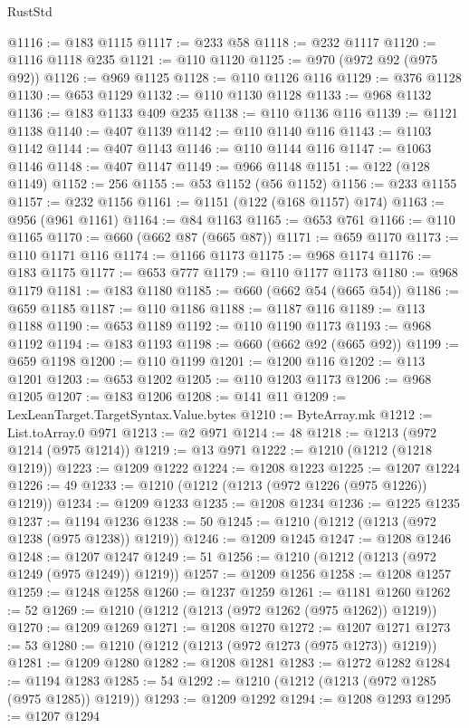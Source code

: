 \begin{lexlean}{RustStd}
\begin{coremodule}
{\begin{coremodule}
{{{{{{{{{{{{{{{{{{{{{{{{{{{{{{{{{{{{{{{{{{{{{{{@1116 := @183 @1115
@1117 := @233 @58
@1118 := @232 @1117
@1120 := @1116 @1118 @235
@1121 := @110 @1120
@1125 := @970 (@972 @92 (@975 @92))
@1126 := @969 @1125
@1128 := @110 @1126 @116
@1129 := @376 @1128
@1130 := @653 @1129
@1132 := @110 @1130 @1128
@1133 := @968 @1132
@1136 := @183 @1133 @409 @235
@1138 := @110 @1136 @116
@1139 := @1121 @1138
@1140 := @407 @1139
@1142 := @110 @1140 @116
@1143 := @1103 @1142
@1144 := @407 @1143
@1146 := @110 @1144 @116
@1147 := @1063 @1146
@1148 := @407 @1147
@1149 := @966 @1148
@1151 := @122 (@128 @1149)
@1152 := 256
@1155 := @53 @1152 (@56 @1152)
@1156 := @233 @1155
@1157 := @232 @1156
@1161 := @1151 (@122 (@168 @1157) @174)
@1163 := @956 (@961 @1161)
@1164 := @84 @1163
@1165 := @653 @761
@1166 := @110 @1165
@1170 := @660 (@662 @87 (@665 @87))
@1171 := @659 @1170
@1173 := @110 @1171 @116
@1174 := @1166 @1173
@1175 := @968 @1174
@1176 := @183 @1175
@1177 := @653 @777
@1179 := @110 @1177 @1173
@1180 := @968 @1179
@1181 := @183 @1180
@1185 := @660 (@662 @54 (@665 @54))
@1186 := @659 @1185
@1187 := @110 @1186
@1188 := @1187 @116
@1189 := @113 @1188
@1190 := @653 @1189
@1192 := @110 @1190 @1173
@1193 := @968 @1192
@1194 := @183 @1193
@1198 := @660 (@662 @92 (@665 @92))
@1199 := @659 @1198
@1200 := @110 @1199
@1201 := @1200 @116
@1202 := @113 @1201
@1203 := @653 @1202
@1205 := @110 @1203 @1173
@1206 := @968 @1205
@1207 := @183 @1206
@1208 := @141 @11
@1209 := LexLeanTarget.TargetSyntax.Value.bytes
@1210 := ByteArray.mk
@1212 := List.toArray.{0} @971
@1213 := @2 @971
@1214 := 48
@1218 := @1213 (@972 @1214 (@975 @1214))
@1219 := @13 @971
@1222 := @1210 (@1212 (@1218 @1219))
@1223 := @1209 @1222
@1224 := @1208 @1223
@1225 := @1207 @1224
@1226 := 49
@1233 := @1210 (@1212 (@1213 (@972 @1226 (@975 @1226)) @1219))
@1234 := @1209 @1233
@1235 := @1208 @1234
@1236 := @1225 @1235
@1237 := @1194 @1236
@1238 := 50
@1245 := @1210 (@1212 (@1213 (@972 @1238 (@975 @1238)) @1219))
@1246 := @1209 @1245
@1247 := @1208 @1246
@1248 := @1207 @1247
@1249 := 51
@1256 := @1210 (@1212 (@1213 (@972 @1249 (@975 @1249)) @1219))
@1257 := @1209 @1256
@1258 := @1208 @1257
@1259 := @1248 @1258
@1260 := @1237 @1259
@1261 := @1181 @1260
@1262 := 52
@1269 := @1210 (@1212 (@1213 (@972 @1262 (@975 @1262)) @1219))
@1270 := @1209 @1269
@1271 := @1208 @1270
@1272 := @1207 @1271
@1273 := 53
@1280 := @1210 (@1212 (@1213 (@972 @1273 (@975 @1273)) @1219))
@1281 := @1209 @1280
@1282 := @1208 @1281
@1283 := @1272 @1282
@1284 := @1194 @1283
@1285 := 54
@1292 := @1210 (@1212 (@1213 (@972 @1285 (@975 @1285)) @1219))
@1293 := @1209 @1292
@1294 := @1208 @1293
@1295 := @1207 @1294
}}}}}}}}}}}}}}}}}}}}}}}}}}}}}}}}}}}}}}}}}}}}}}}
\end{coremodule}}
\end{coremodule}
\end{lexlean}
